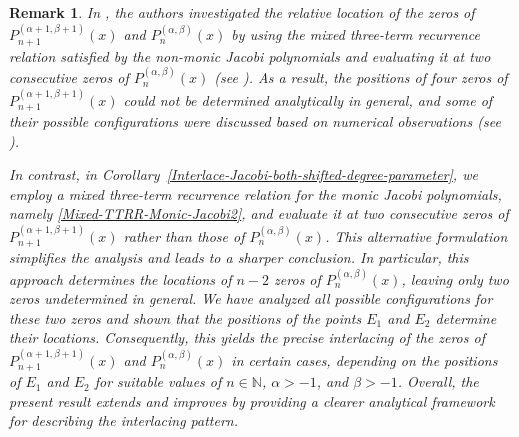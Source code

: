 \documentclass[final,3p,times,12pt]{elsarticle}
\newtheorem{remark}{Remark}[section]
\numberwithin{equation}{section}  %
\begin{document}
	\begin{remark}  
		In \cite[Theorem~2 and Remark~6]{Arvesu-Driver-Littlejohn-RamanujanJ-2023}, the authors investigated the relative location of the zeros of 
		${P}^{(\alpha+1,\beta+1)}_{n+1}(x)$ and ${P}^{(\alpha,\beta)}_{n}(x)$ 
		by using the mixed three-term recurrence relation satisfied by the non-monic Jacobi polynomials 
		\cite[eq.~(13)]{Arvesu-Driver-Littlejohn-RamanujanJ-2023} and evaluating it at two consecutive zeros of 
		${P}^{(\alpha,\beta)}_{n}(x)$ (see \cite[eq.~(15)]{Arvesu-Driver-Littlejohn-RamanujanJ-2023}). 
		As a result, the positions of four zeros of 
		${P}^{(\alpha+1,\beta+1)}_{n+1}(x)$ could not be determined analytically in general, 
		and some of their possible configurations were discussed based on numerical observations 
		(see \cite[Remark~6]{Arvesu-Driver-Littlejohn-RamanujanJ-2023}). 
		
		In contrast, in Corollary~\ref{Interlace-Jacobi-both-shifted-degree-parameter}, 
		we employ a mixed three-term recurrence relation for the monic Jacobi polynomials, namely 
		\eqref{Mixed-TTRR-Monic-Jacobi2}, and evaluate it at two consecutive zeros of 
		${P}^{(\alpha+1,\beta+1)}_{n+1}(x)$ rather than those of ${P}^{(\alpha,\beta)}_{n}(x)$. 
		This alternative formulation  simplifies the analysis and leads to a sharper conclusion. 
		In particular, this approach determines the locations of $n-2$ zeros of ${P}^{(\alpha,\beta)}_{n}(x)$, 
		leaving only two zeros undetermined in general. We have analyzed all possible configurations for these two zeros 
		and shown that the positions of the points $E_1$ and $E_2$ determine their locations. 
		Consequently, this yields the precise interlacing of the zeros of 
		${P}^{(\alpha+1,\beta+1)}_{n+1}(x)$ and ${P}^{(\alpha,\beta)}_{n}(x)$ 
		in certain cases, depending on the positions of $E_1$ and $E_2$ for suitable values of $n\in\mathbb{N}$, $\alpha>-1$, and $\beta>-1$. 
		Overall, the present result extends and improves 
		\cite[Theorem~2 and Remark~6]{Arvesu-Driver-Littlejohn-RamanujanJ-2023} 
		by providing a clearer analytical framework for describing the interlacing pattern.
	\end{remark}
\end{document}
